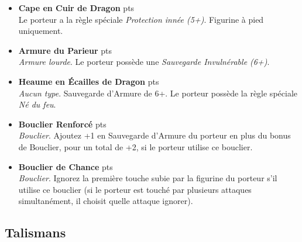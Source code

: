 \begin{multicols}{2}
\begin{itemize}[label={-}]
\item \textbf{Cape en Cuir de Dragon}  {pts} \\
Le porteur a la règle spéciale \emph{Protection innée (5+)}. Figurine à pied uniquement.

\item \textbf{Armure du Parieur}  {pts} \\
\emph{Armure lourde}. Le porteur possède une \emph{Sauvegarde Invulnérable (6+)}.

\item \textbf{Heaume en Écailles de Dragon}  {pts} \\
\emph{Aucun type}. Sauvegarde d'Armure de 6+. Le porteur possède la règle spéciale \emph{Né du feu}.

\item \textbf{Bouclier Renforcé}  {pts} \\
\emph{Bouclier}. Ajoutez +1 en Sauvegarde d'Armure du porteur en plus du bonus de Bouclier, pour un total de +2, si le porteur utilise ce bouclier.

\item \textbf{Bouclier de Chance}  {pts} \\
\emph{Bouclier}. Ignorez la première touche subie par la figurine du porteur s'il utilise ce bouclier (si le porteur est touché par plusieurs attaques simultanément, il choisit quelle attaque ignorer).

\end{itemize}
\end{multicols}

\newpage

\subsection{Talismans}

